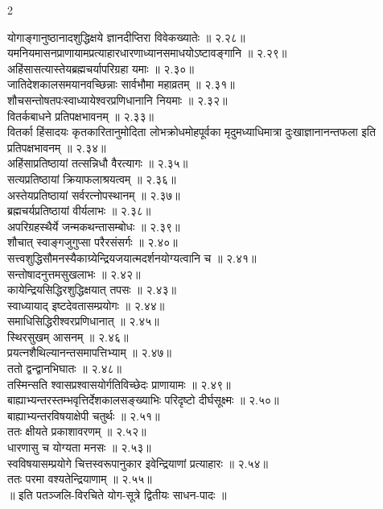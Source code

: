 \documentclass[9pt,a4paper,landscape]{article}
\begin{document}
\begin{multicols}{2}
\begin{flushleft}
योगाङ्गानुष्ठानादशुद्धिक्षये ज्ञानदीप्तिरा विवेकख्यातेः ॥ २.२८॥\\
यमनियमासनप्राणायामप्रत्याहारधारणाध्यानसमाधयोऽष्टावङ्गानि ॥ २.२९॥\\
अहिंसासत्यास्तेयब्रह्मचर्यापरिग्रहा यमाः ॥ २.३०॥\\
जातिदेशकालसमयानवच्छिन्नाः सार्वभौमा महाव्रतम् ॥ २.३१॥\\
शौचसन्तोषतपःस्वाध्यायेश्वरप्रणिधानानि नियमाः ॥ २.३२॥\\
वितर्कबाधने प्रतिपक्षभावनम् ॥ २.३३॥\\
वितर्का हिंसादयः कृतकारितानुमोदिता लोभक्रोधमोहपूर्वका मृदुमध्याधिमात्रा दुःखाज्ञानानन्तफला इति प्रतिपक्षभावनम् ॥ २.३४॥\\
अहिंसाप्रतिष्ठायां तत्सन्निधौ वैरत्यागः ॥ २.३५॥\\
सत्यप्रतिष्ठायां क्रियाफलाश्रयत्वम् ॥ २.३६॥\\
अस्तेयप्रतिष्ठायां सर्वरत्नोपस्थानम् ॥ २.३७॥\\
ब्रह्मचर्यप्रतिष्ठायां वीर्यलाभः ॥ २.३८॥\\
अपरिग्रहस्थैर्ये जन्मकथन्तासम्बोधः ॥ २.३९॥\\
शौचात् स्वाङ्गजुगुप्सा परैरसंसर्गः ॥ २.४०॥\\
सत्त्वशुद्धिसौमनस्यैकाग्र्येन्द्रियजयात्मदर्शनयोग्यत्वानि च ॥ २.४१॥\\
सन्तोषादनुत्तमसुखलाभः ॥ २.४२॥\\
कायेन्द्रियसिद्धिरशुद्धिक्षयात् तपसः ॥ २.४३॥\\
स्वाध्यायाद् इष्टदेवतासम्प्रयोगः ॥ २.४४॥\\
समाधिसिद्धिरीश्वरप्रणिधानात् ॥ २.४५॥\\
स्थिरसुखम् आसनम् ॥ २.४६॥\\
प्रयत्नशैथिल्यानन्तसमापत्तिभ्याम् ॥ २.४७॥\\
ततो द्वन्द्वानभिघातः ॥ २.४८॥\\
तस्मिन्सति श्वासप्रश्वासयोर्गतिविच्छेदः प्राणायामः ॥ २.४९॥\\
बाह्याभ्यन्तरस्तम्भवृत्तिर्देशकालसङ्ख्याभिः परिदृष्टो दीर्घसूक्ष्मः ॥ २.५०॥\\
बाह्याभ्यन्तरविषयाक्षेपी चतुर्थः ॥ २.५१॥\\
ततः क्षीयते प्रकाशावरणम् ॥ २.५२॥\\
धारणासु च योग्यता मनसः ॥ २.५३॥\\
स्वविषयासम्प्रयोगे चित्तस्वरूपानुकार इवेन्द्रियाणां प्रत्याहारः ॥ २.५४॥\\
ततः परमा वश्यतेन्द्रियाणाम् ॥ २.५५॥\\
॥ इति पतञ्जलि-विरचिते योग-सूत्रे द्वितीयः साधन-पादः ॥\\
\end{flushleft}


\end{multicols}
\end{document}
